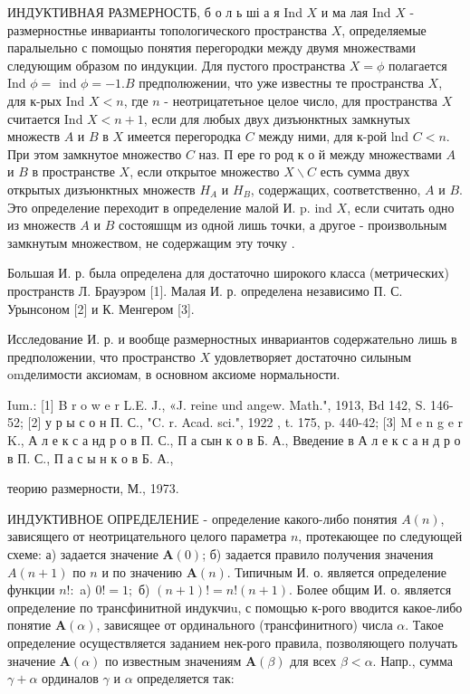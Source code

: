 \documentclass[10pt]{article}
\begin{document}
ИНДУКТИВНАЯ РАЗМЕРНОСТБ, б о л ь ші а я Ind $X$ и ма лая Ind $X$ - размерностнье инварианты топологического пространства $X$, определяемые паралыельно с помощыо понятия перегородки между двумя множествами следующим образом по индукции. Для пустого пространства $X=\phi$ полагается Ind $\phi=$ ind $\phi=-1 . B$ предполюжении, что уже известны те пространства $X$, для к-рых Ind $X<n$, где $n$ - неотрицатетьное целое число, для пространства $X$ считается Ind $X<n+1$, если для любых двух дизъюнктных замкнутых множеств $A$ и $B$ в $X$ имеется перегородка $C$ между ними, для к-рой lnd $C<n$. При этом замкнутое множество $C$ наз. П ере го род к о й между множествами $A$ и $B$ в пространстве $X$, если открытое множество $X \backslash C$ есть сумма двух открытых дизъюнктных множеств $H_{A}$ и $H_{B}$, содержащих, соответственно, $A$ и $B$. Это определение переходит в определение малой $И$. p. ind $X$, если считать одно из множеств $A$ и $B$ состояшщм из одной лишь точки, а другое - произвольным замкнутым множеством, не содержащим эту точку .



Большая И. р. была определена для достаточно широкого класса (метрических) пространств Л. Брауэром [1]. Малая И. р. определена независимо П. С. Урынсоном [2] и К. Менгером [3].



Исследование И. р. и вообще размерностных инвариантов содержательно лишь в предположении, что пространство $X$ удовлетворяет достаточно силыным omделимости аксиомам, в основном аксиоме нормальности.



Ium.: [1] B r o w e r L.E. J., «J. reine und angew. Math.", 1913, Bd 142, S. 146-52; [2] у р ы с о н П. С., "C. r. Acad. sci.", 1922 , t. 175, p. 440-42; [3] M e n g e r K., А л е к с а нд р о в П. С., П а сын к о в Б. А., Введение в А л е к с а н д р о в П. С., П а с ы н к о в Б. А.,

теорию размерности, М., 1973.



ИНДУКТИВНОЕ ОПРЕДЕЛЕНИЕ - определение какого-либо понятия $A(n)$, зависящего от неотрицательного целого параметра $n$, протекающее по следующей схеме: а) задается значение $\boldsymbol{A}(0)$; б) задается правило получения значения $A(n+1)$ по $n$ и по значению $\boldsymbol{A}(n)$. Типичным И. о. является определение функции $n !:$ a) $0 !=1 ;$ б) $(n+1) !=n !(n+1)$. Более общим И. о. является определение по трансфинитной индукчиu, с помощью к-рого вводится какое-либо понятие $\boldsymbol{A}(\alpha)$, зависящее от ординального (трансфинитного) числа $\alpha$. Такое определение осуществляется заданием нек-рого правила, позволяющего получать значение $\boldsymbol{A}(\alpha)$ по известным значениям $\boldsymbol{A}(\beta)$ для всех $\beta<\alpha$. Напр., сумма $\gamma+\alpha$ ординалов $\gamma$ и $\alpha$ определяется так:
\end{document}
